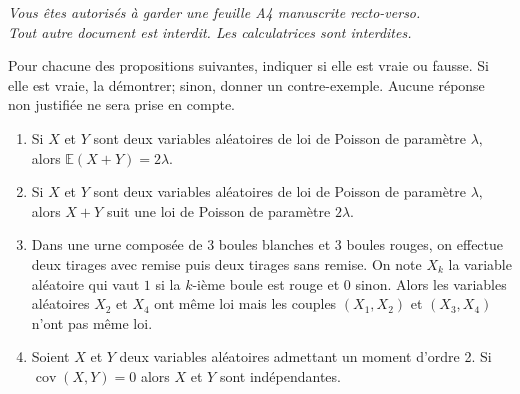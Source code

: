 \documentclass[a4paper,12pt,reqno]{amsart}
\begin{document}
\ifsolutions\else
\hfill\begin{minipage}[c]{.9\textwidth}
\emph{%
  Vous êtes autorisés à garder une feuille A4 manuscrite recto-verso.\\
  Tout autre document est interdit. Les calculatrices sont interdites.
}
\end{minipage}
\tsvp
\vspace*{14mm}
\fi


\begin{exo} %
  Pour chacune des propositions suivantes, indiquer si elle est vraie ou fausse. Si elle est vraie, la démontrer; sinon, donner un contre-exemple. Aucune réponse non justifiée ne sera prise en compte.
  \begin{enumerate}
    \item Si $X$ et $Y$ sont deux variables aléatoires de loi de Poisson de paramètre $\lambda,$ alors $\mathbb E(X+Y)=2\lambda$.
    \item Si $X$ et $Y$ sont deux variables aléatoires de loi de Poisson de paramètre $\lambda,$ alors $X+Y$ suit une loi de Poisson de paramètre $2 \lambda$.
    \item Dans une urne composée de 3 boules blanches et 3 boules rouges, on effectue deux tirages avec remise puis deux tirages sans remise. On note $X_k$ la variable aléatoire qui vaut $1$ si la $k$-ième boule est rouge et $0$ sinon. Alors les variables aléatoires $X_2$ et $X_4$ ont même loi mais les couples $(X_1, X_2)$ et $(X_3, X_4)$ n'ont pas même loi.
    \item Soient $X$ et $Y$ deux variables aléatoires admettant un moment d'ordre 2. Si $\operatorname{cov}(X,Y) = 0$ alors $X$ et $Y$ sont indépendantes.
  \end{enumerate}
\end{exo}
\medskip
\end{document}
